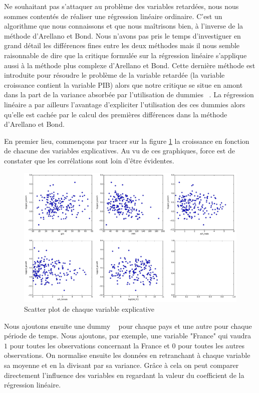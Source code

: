 \documentclass[11pt,a4paper]{article}
\begin{document}
Ne souhaitant pas s'attaquer au problème des variables retardées, nous nous sommes contentés de réaliser une régression linéaire ordinaire. C'est un algorithme que nous connaissons et que nous maîtrisons bien, à l'inverse de la méthode d'Arellano et Bond. Nous n'avons pas pris le temps d'investiguer en grand détail les différences fines entre les deux méthodes mais il nous semble raisonnable de dire que la critique formulée sur la régression linéaire s'applique aussi à la méthode plus complexe d'Arellano et Bond. Cette dernière méthode est introduite pour résoudre le problème de la variable retardée (la variable croissance contient la variable PIB) alors que notre critique se situe en amont dans la part de la variance absorbée par l'utilisation de \og dummies \fg~. La régression linéaire a par ailleurs l'avantage d'expliciter l'utilisation des ces \og dummies \fg{} alors qu'elle est cachée par le calcul des premières différences dans la méthode d'Arellano et Bond. 

En premier lieu, commençons par tracer sur la figure \ref{scatter_plot} la croissance en fonction de chacune des variables explicatives. Au vu de ces graphiques, force est de constater que les corrélations sont loin d'être évidentes.

\begin{figure}[h!]
\begin{center}
\includegraphics[scale=0.4]{scatter_plot_1.pdf}
\caption{Scatter plot de chaque variable explicative}
\label{scatter_plot}
\end{center}
\end{figure}

Nous ajoutons ensuite une \og dummy \fg~ pour chaque pays et une autre pour chaque période de temps. Nous ajoutons, par exemple, une variable "France" qui vaudra $1$ pour toutes les observations concernant la France et $0$ pour toutes les autres observations. On normalise ensuite les données en retranchant à chaque variable sa moyenne et en la divisant par sa variance. Grâce à cela on peut comparer directement l'influence des variables en regardant la valeur du coefficient de la régression linéaire.
\end{document}

